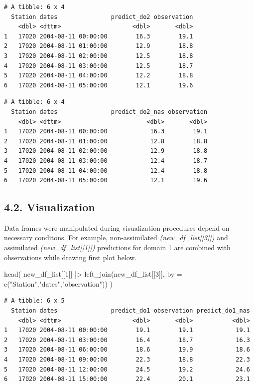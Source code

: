 \documentclass[
  letterpaper,
  DIV=11,
  numbers=noendperiod,
  abstract]{scrartcl}
\newenvironment{Shaded}{\begin{snugshade}}{\end{snugshade}}
\newcommand{\AttributeTok}[1]{\textcolor[rgb]{0.40,0.45,0.13}{#1}}
\newcommand{\DecValTok}[1]{\textcolor[rgb]{0.68,0.00,0.00}{#1}}
\newcommand{\FunctionTok}[1]{\textcolor[rgb]{0.28,0.35,0.67}{#1}}
\newcommand{\NormalTok}[1]{\textcolor[rgb]{0.00,0.23,0.31}{#1}}
\newcommand{\SpecialCharTok}[1]{\textcolor[rgb]{0.37,0.37,0.37}{#1}}
\newcommand{\StringTok}[1]{\textcolor[rgb]{0.13,0.47,0.30}{#1}}
\begin{document}
\begin{verbatim}
# A tibble: 6 x 4
  Station dates               predict_do2 observation
    <dbl> <dttm>                    <dbl>       <dbl>
1   17020 2004-08-11 00:00:00        16.3        19.1
2   17020 2004-08-11 01:00:00        12.9        18.8
3   17020 2004-08-11 02:00:00        12.5        18.8
4   17020 2004-08-11 03:00:00        12.5        18.7
5   17020 2004-08-11 04:00:00        12.2        18.8
6   17020 2004-08-11 05:00:00        12.1        19.6
\end{verbatim}

\begin{verbatim}
# A tibble: 6 x 4
  Station dates               predict_do2_nas observation
    <dbl> <dttm>                        <dbl>       <dbl>
1   17020 2004-08-11 00:00:00            16.3        19.1
2   17020 2004-08-11 01:00:00            12.8        18.8
3   17020 2004-08-11 02:00:00            12.9        18.8
4   17020 2004-08-11 03:00:00            12.4        18.7
5   17020 2004-08-11 04:00:00            12.4        18.8
6   17020 2004-08-11 05:00:00            12.1        19.6
\end{verbatim}

\hypertarget{visualization}{%
\subsection{4.2. Visualization}\label{visualization}}

Data frames were manipulated during visualization procedures depend on
necessary conditons. For example, non-assimilated
\emph{(new\_df\_list{[}{[}3{]}{]})} and assimilated
\emph{(new\_df\_list{[}{[}1{]}{]})} predictions for domain 1 are
combined with observations while drawing first plot below.

\begin{Shaded}
\begin{Highlighting}[]
\FunctionTok{head}\NormalTok{(}
\NormalTok{  new\_df\_list[[}\DecValTok{1}\NormalTok{]] }\SpecialCharTok{|\textgreater{}}        
    \FunctionTok{left\_join}\NormalTok{(new\_df\_list[[}\DecValTok{3}\NormalTok{]], }\AttributeTok{by =} \FunctionTok{c}\NormalTok{(}\StringTok{"Station"}\NormalTok{,}\StringTok{"dates"}\NormalTok{,}\StringTok{"observation"}\NormalTok{)) )}
\end{Highlighting}
\end{Shaded}

\begin{verbatim}
# A tibble: 6 x 5
  Station dates               predict_do1 observation predict_do1_nas
    <dbl> <dttm>                    <dbl>       <dbl>           <dbl>
1   17020 2004-08-11 00:00:00        19.1        19.1            19.1
2   17020 2004-08-11 03:00:00        16.4        18.7            16.3
3   17020 2004-08-11 06:00:00        18.6        19.9            18.6
4   17020 2004-08-11 09:00:00        22.3        18.8            22.3
5   17020 2004-08-11 12:00:00        24.5        19.2            24.6
6   17020 2004-08-11 15:00:00        22.4        20.1            23.1
\end{verbatim}
\end{document}
